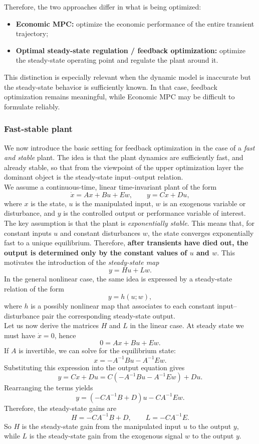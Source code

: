 Therefore, the two approaches differ in what is being optimized:
\begin{itemize}
    \item \textbf{Economic MPC:} optimize the economic performance of the entire transient trajectory;
    \item \textbf{Optimal steady-state regulation / feedback optimization:} optimize the steady-state operating point and regulate the plant around it.
\end{itemize}

This distinction is especially relevant when the dynamic model is inaccurate but the steady-state behavior is sufficiently known. In that case, feedback optimization remains meaningful, while Economic MPC may be difficult to formulate reliably.

\subsubsection{Fast-stable plant}

We now introduce the basic setting for feedback optimization in the case of a \emph{fast and stable} plant. The idea is that the plant dynamics are sufficiently fast, and already stable, so that from the viewpoint of the upper optimization layer the dominant object is the steady-state input--output relation.\\

We assume a continuous-time, linear time-invariant plant of the form
\[
\dot x = Ax + Bu + Ew,
\qquad
y = Cx + Du,
\]
where $x$ is the state, $u$ is the manipulated input, $w$ is an exogenous variable or disturbance, and $y$ is the controlled output or performance variable of interest.\\

The key assumption is that the plant is \emph{exponentially stable}. This means that, for constant inputs $u$ and constant disturbances $w$, the state converges exponentially fast to a unique equilibrium. Therefore, \textbf{after transients have died out, the output is determined only by the constant values of $u$ and $w$}. This motivates the introduction of the \emph{steady-state map}
\[
y = Hu + Lw.
\]
In the general nonlinear case, the same idea is expressed by a steady-state relation of the form
\[
y = h(u;w),
\]
where $h$ is a possibly nonlinear map that associates to each constant input--disturbance pair the corresponding steady-state output.\\
Let us now derive the matrices $H$ and $L$ in the linear case. At steady state we must have $\dot x = 0$, hence
\[
0 = Ax + Bu + Ew.
\]
If $A$ is invertible, we can solve for the equilibrium state:
\[
x = -A^{-1}Bu - A^{-1}Ew.
\]
Substituting this expression into the output equation gives
\[
y = Cx + Du
  = C\left(-A^{-1}Bu - A^{-1}Ew\right) + Du.
\]
Rearranging the terms yields
\[
y = \left(-CA^{-1}B + D\right)u - CA^{-1}Ew.
\]
Therefore, the steady-state gains are
\[
H = -CA^{-1}B + D,
\qquad
L = -CA^{-1}E.
\]
So $H$ is the steady-state gain from the manipulated input $u$ to the output $y$, while $L$ is the steady-state gain from the exogenous signal $w$ to the output $y$.\\


